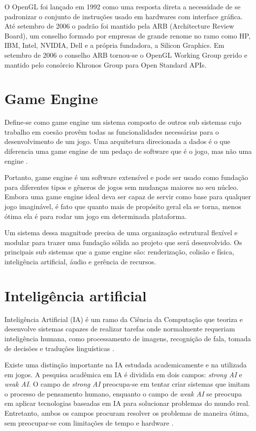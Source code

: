 \documentclass[12pt, 
openright, 
oneside, 
a4paper,    
brazil]{facom-ufu-abntex2}
\begin{document}
 O OpenGL foi lançado em 1992 como uma resposta direta a necessidade de se padronizar o conjunto de instruções usado em hardwares com interface gráfica. Até setembro de 2006 o padrão foi mantido pela ARB (Architecture Review Board), um conselho formado por empresas de grande renome no ramo como HP, IBM, Intel, NVIDIA, Dell e a própria fundadora, a Silicon Graphics. Em setembro de 2006 o conselho ARB tornou-se o OpenGL Working Group gerido e mantido pelo consórcio Khronos Group para Open Standard APIs\cite{OpenGLAbout}.
 
\section{Game Engine}
Define-se como game engine um sistema composto de outros sub sistemas cujo trabalho em coesão provêm todas as funcionalidades necessárias para o desenvolvimento de um jogo. Uma arquitetura direcionada a dados é o que diferencia uma game engine de um pedaço de software que é o jogo, mas não uma engine \cite{GameEngineArchitecture}. 

Portanto, game engine é um software extensível e pode ser usado como fundação para diferentes tipos e gêneros de jogos sem mudanças maiores no seu núcleo. Embora uma game engine ideal deva ser capaz de servir como base para qualquer jogo imaginável, é fato que quanto mais de propósito geral ela se torna, menos ótima ela é para rodar um jogo em determinada plataforma. 
 
Um sistema dessa magnitude precisa de uma organização estrutural flexível e modular para trazer uma fundação sólida ao projeto que será desenvolvido. Os principais sub sistemas que a game engine são: renderização, colisão e física, inteligência artificial, áudio e gerência de recursos.
\section{Inteligência artificial}
Inteligência Artificial (IA) é um ramo da Ciência da Computação que teoriza e desenvolve sistemas capazes de realizar tarefas onde normalmente requeriam inteligência humana, como processamento de imagens, recognição de fala, tomada de decisões e traduções linguísticas \cite{AIDefinition}.

 Existe uma distinção importante na IA estudada academicamente e na utilizada em jogos. A pesquisa acadêmica em IA é dividida em dois campos: \textit{strong AI} e \textit{weak AI}. O campo de \textit{strong AI} preocupa-se em tentar criar sistemas que imitam o processo de pensamento humano, enquanto o campo de \textit{weak AI} se preocupa em aplicar tecnologias baseadas em IA para solucionar problemas do mundo real. Entretanto, ambos os campos procuram resolver os problemas de maneira ótima, sem preocupar-se com limitações de tempo e hardware \cite{ProgrammingGameAIByExample}.
\end{document}
